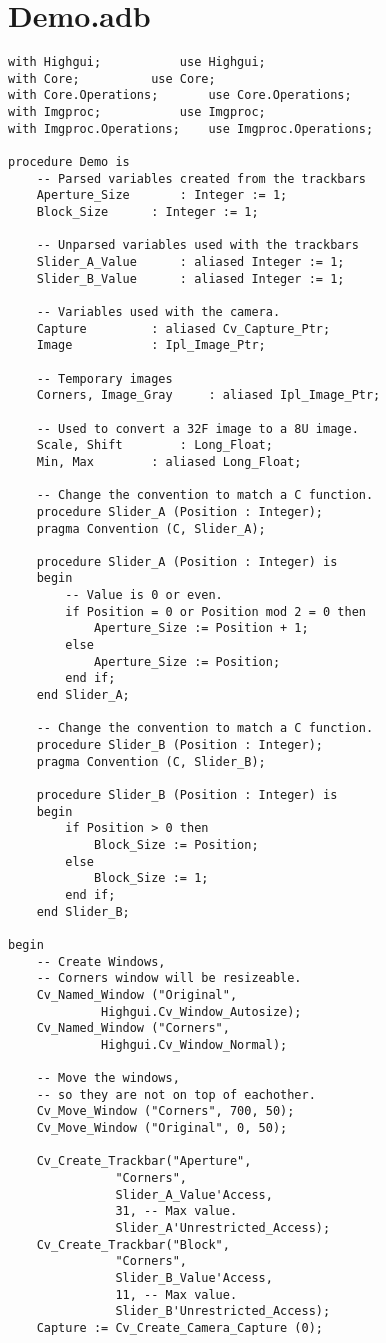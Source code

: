 \section{Demo.adb}
\begin{lstlisting}
with Highgui; 			use Highgui;
with Core; 			use Core;
with Core.Operations; 		use Core.Operations;
with Imgproc; 			use Imgproc;
with Imgproc.Operations; 	use Imgproc.Operations;

procedure Demo is
	-- Parsed variables created from the trackbars
	Aperture_Size		: Integer := 1;
	Block_Size 		: Integer := 1;

	-- Unparsed variables used with the trackbars
	Slider_A_Value 		: aliased Integer := 1;
	Slider_B_Value 		: aliased Integer := 1;   

	-- Variables used with the camera.
	Capture 		: aliased Cv_Capture_Ptr;
	Image 			: Ipl_Image_Ptr;

	-- Temporary images
	Corners, Image_Gray 	: aliased Ipl_Image_Ptr;
   	
	-- Used to convert a 32F image to a 8U image.
	Scale, Shift		: Long_Float;
	Min, Max 		: aliased Long_Float;

	-- Change the convention to match a C function.
	procedure Slider_A (Position : Integer);
	pragma Convention (C, Slider_A);   

	procedure Slider_A (Position : Integer) is
	begin
		-- Value is 0 or even.
		if Position = 0 or Position mod 2 = 0 then 
			Aperture_Size := Position + 1;
		else
			Aperture_Size := Position;
		end if;
	end Slider_A;

	-- Change the convention to match a C function.
	procedure Slider_B (Position : Integer);
	pragma Convention (C, Slider_B);

	procedure Slider_B (Position : Integer) is
	begin
		if Position > 0 then
			Block_Size := Position;
		else
			Block_Size := 1;
		end if;
	end Slider_B;

begin
	-- Create Windows, 
	-- Corners window will be resizeable. 
	Cv_Named_Window ("Original",
			 Highgui.Cv_Window_Autosize);
	Cv_Named_Window ("Corners", 
			 Highgui.Cv_Window_Normal);

	-- Move the windows, 
	-- so they are not on top of eachother.
	Cv_Move_Window ("Corners", 700, 50);
	Cv_Move_Window ("Original", 0, 50);

	Cv_Create_Trackbar("Aperture",
			   "Corners",
			   Slider_A_Value'Access, 
			   31, -- Max value.
			   Slider_A'Unrestricted_Access);
  	Cv_Create_Trackbar("Block", 
			   "Corners", 
			   Slider_B_Value'Access,
			   11, -- Max value.
			   Slider_B'Unrestricted_Access);
	Capture := Cv_Create_Camera_Capture (0);


\end{lstlisting}
